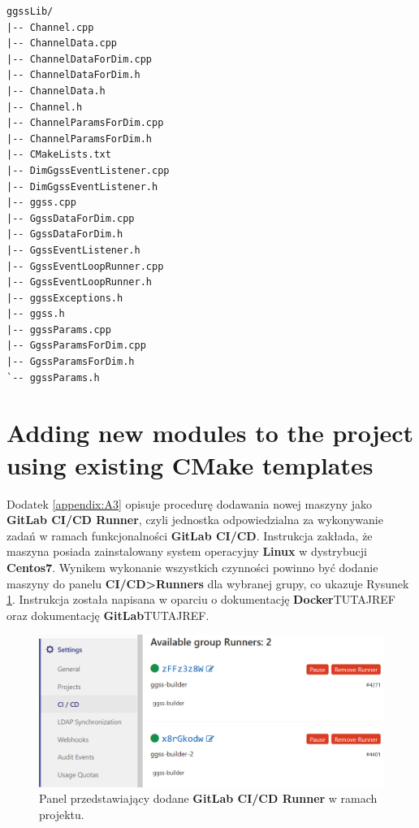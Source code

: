\newpage

\begin{lstlisting}
ggssLib/
|-- Channel.cpp
|-- ChannelData.cpp
|-- ChannelDataForDim.cpp
|-- ChannelDataForDim.h
|-- ChannelData.h
|-- Channel.h
|-- ChannelParamsForDim.cpp
|-- ChannelParamsForDim.h
|-- CMakeLists.txt
|-- DimGgssEventListener.cpp
|-- DimGgssEventListener.h
|-- ggss.cpp
|-- GgssDataForDim.cpp
|-- GgssDataForDim.h
|-- GgssEventListener.h
|-- GgssEventLoopRunner.cpp
|-- GgssEventLoopRunner.h
|-- ggssExceptions.h
|-- ggss.h
|-- ggssParams.cpp
|-- GgssParamsForDim.cpp
|-- GgssParamsForDim.h
`-- ggssParams.h
\end{lstlisting}

\onecolumn

\section{Adding new modules to the project using existing CMake templates}
\label{appendix:A2}

\newpage





Dodatek \ref{appendix:A3} opisuje procedurę dodawania nowej maszyny jako \textbf{GitLab CI/CD Runner}, czyli jednostka odpowiedzialna za wykonywanie zadań w ramach funkcjonalności \textbf{GitLab CI/CD}. Instrukcja zakłada, że maszyna posiada zainstalowany system operacyjny \textbf{Linux} w dystrybucji \textbf{Centos7}. Wynikem wykonanie wszystkich czynności powinno być dodanie maszyny do panelu \textbf{CI/CD>Runners} dla wybranej grupy, co ukazuje Rysunek \ref{fig:runner}. Instrukcja została napisana w oparciu o dokumentację \textbf{Docker}TUTAJREF oraz dokumentację \textbf{GitLab}TUTAJREF.

\begin{figure}
\caption{Panel przedstawiający dodane \textbf{GitLab CI/CD Runner} w ramach projektu.}
\label{fig:runner}
\includegraphics[width=\textwidth]{res/png/runnerAdded}
\end{figure}
